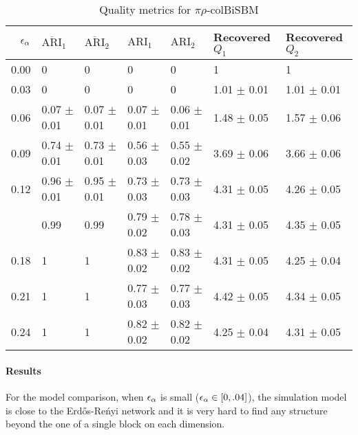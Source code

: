 \begin{table}[!h]

\caption{\label{tab:per_model_table}\label{tab:per_model_pirho}Quality metrics for $\pi\rho$-colBiSBM}
\centering
\begin{tabular}[t]{rllllll}
\toprule
$\eps[\alpha]$ & $\overline{\text{ARI}}_{1}$ & $\overline{\text{ARI}}_{2}$ & $\text{ARI}_{1}$ & $\text{ARI}_{2}$ & Recovered $Q_1$ & Recovered $Q_2$\\
\midrule
0.00 & 0 & 0 & 0 & 0 & 1 & 1\\
0.03 & 0 & 0 & 0 & 0 & 1.01 $\pm$ 0.01 & 1.01 $\pm$ 0.01\\
0.06 & 0.07 $\pm$ 0.01 & 0.07 $\pm$ 0.01 & 0.07 $\pm$ 0.01 & 0.06 $\pm$ 0.01 & 1.48 $\pm$ 0.05 & 1.57 $\pm$ 0.06\\
0.09 & 0.74 $\pm$ 0.01 & 0.73 $\pm$ 0.01 & 0.56 $\pm$ 0.03 & 0.55 $\pm$ 0.02 & 3.69 $\pm$ 0.06 & 3.66 $\pm$ 0.06\\
0.12 & 0.96 $\pm$ 0.01 & 0.95 $\pm$ 0.01 & 0.73 $\pm$ 0.03 & 0.73 $\pm$ 0.03 & 4.31 $\pm$ 0.05 & 4.26 $\pm$ 0.05\\
\addlinespace
0.15 & 0.99 & 0.99 & 0.79 $\pm$ 0.02 & 0.78 $\pm$ 0.03 & 4.31 $\pm$ 0.05 & 4.35 $\pm$ 0.05\\
0.18 & 1 & 1 & 0.83 $\pm$ 0.02 & 0.83 $\pm$ 0.02 & 4.31 $\pm$ 0.05 & 4.25 $\pm$ 0.04\\
0.21 & 1 & 1 & 0.77 $\pm$ 0.03 & 0.77 $\pm$ 0.03 & 4.42 $\pm$ 0.05 & 4.34 $\pm$ 0.05\\
0.24 & 1 & 1 & 0.82 $\pm$ 0.02 & 0.82 $\pm$ 0.02 & 4.25 $\pm$ 0.04 & 4.31 $\pm$ 0.05\\
\bottomrule
\end{tabular}
\end{table}

\paragraph{Results}

For the model comparison, when \(\eps[\alpha]\) is small
(\(\eps[\alpha]\in[0, .04]\)), the simulation model is close to the
Erd\H{o}s-Reńyi network and it is very hard to find any structure beyond
the one of a single block on each dimension.
